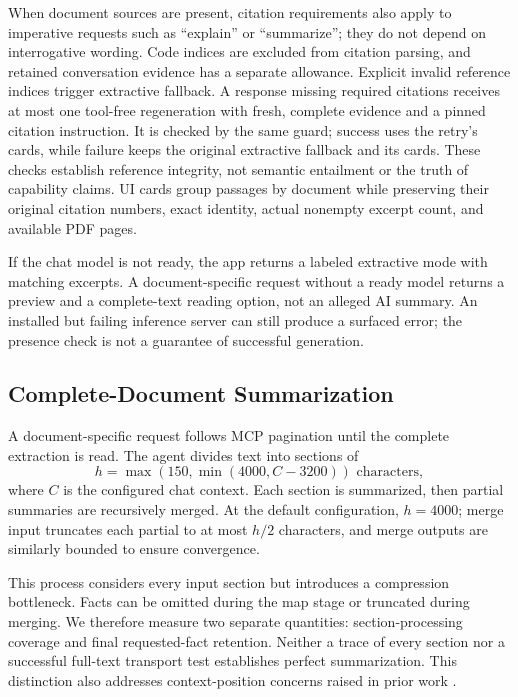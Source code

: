 \documentclass[conference,letterpaper]{IEEEtran}
\begin{document}
When document sources are present, citation requirements also apply to imperative requests such as ``explain'' or ``summarize''; they do not depend on interrogative wording. Code indices are excluded from citation parsing, and retained conversation evidence has a separate allowance. Explicit invalid reference indices trigger extractive fallback. A response missing required citations receives at most one tool-free regeneration with fresh, complete evidence and a pinned citation instruction. It is checked by the same guard; success uses the retry's cards, while failure keeps the original extractive fallback and its cards. These checks establish reference integrity, not semantic entailment or the truth of capability claims. UI cards group passages by document while preserving their original citation numbers, exact identity, actual nonempty excerpt count, and available PDF pages.

If the chat model is not ready, the app returns a labeled extractive mode with matching excerpts. A document-specific request without a ready model returns a preview and a complete-text reading option, not an alleged AI summary. An installed but failing inference server can still produce a surfaced error; the presence check is not a guarantee of successful generation.

\subsection{Complete-Document Summarization}
A document-specific request follows MCP pagination until the complete extraction is read. The agent divides text into sections of
\begin{equation}
h=\max(150,\min(4000,C-3200))\text{ characters},
\end{equation}
where $C$ is the configured chat context. Each section is summarized, then partial summaries are recursively merged. At the default configuration, $h=4000$; merge input truncates each partial to at most $h/2$ characters, and merge outputs are similarly bounded to ensure convergence.

This process considers every input section but introduces a compression bottleneck. Facts can be omitted during the map stage or truncated during merging. We therefore measure two separate quantities: section-processing coverage and final requested-fact retention. Neither a trace of every section nor a successful full-text transport test establishes perfect summarization. This distinction also addresses context-position concerns raised in prior work \cite{lostmiddle}.
\end{document}
